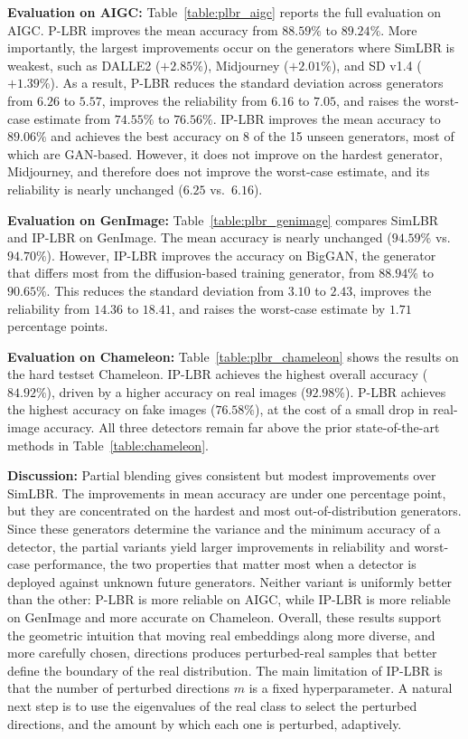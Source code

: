 \noindent\textbf{Evaluation on AIGC:} Table~\ref{table:plbr_aigc} reports the full evaluation on AIGC. P-LBR improves the mean accuracy from $88.59\%$ to $89.24\%$. More importantly, the largest improvements occur on the generators where SimLBR is weakest, such as DALLE2 ($+2.85\%$), Midjourney ($+2.01\%$), and SD v1.4 ($+1.39\%$). As a result, P-LBR reduces the standard deviation across generators from $6.26$ to $5.57$, improves the reliability from $6.16$ to $7.05$, and raises the worst-case estimate from $74.55\%$ to $76.56\%$. IP-LBR improves the mean accuracy to $89.06\%$ and achieves the best accuracy on 8 of the 15 unseen generators, most of which are GAN-based. However, it does not improve on the hardest generator, Midjourney, and therefore does not improve the worst-case estimate, and its reliability is nearly unchanged ($6.25$ vs.\ $6.16$).

\noindent\textbf{Evaluation on GenImage:} Table~\ref{table:plbr_genimage} compares SimLBR and IP-LBR on GenImage. The mean accuracy is nearly unchanged ($94.59\%$ vs.\ $94.70\%$). However, IP-LBR improves the accuracy on BigGAN, the generator that differs most from the diffusion-based training generator, from $88.94\%$ to $90.65\%$. This reduces the standard deviation from $3.10$ to $2.43$, improves the reliability from $14.36$ to $18.41$, and raises the worst-case estimate by $1.71$ percentage points.

\noindent\textbf{Evaluation on Chameleon:} Table~\ref{table:plbr_chameleon} shows the results on the hard testset Chameleon. IP-LBR achieves the highest overall accuracy ($84.92\%$), driven by a higher accuracy on real images ($92.98\%$). P-LBR achieves the highest accuracy on fake images ($76.58\%$), at the cost of a small drop in real-image accuracy. All three detectors remain far above the prior state-of-the-art methods in Table~\ref{table:chameleon}.

\noindent\textbf{Discussion:} Partial blending gives consistent but modest improvements over SimLBR. The improvements in mean accuracy are under one percentage point, but they are concentrated on the hardest and most out-of-distribution generators. Since these generators determine the variance and the minimum accuracy of a detector, the partial variants yield larger improvements in reliability and worst-case performance, the two properties that matter most when a detector is deployed against unknown future generators. Neither variant is uniformly better than the other: P-LBR is more reliable on AIGC, while IP-LBR is more reliable on GenImage and more accurate on Chameleon. Overall, these results support the geometric intuition that moving real embeddings along more diverse, and more carefully chosen, directions produces perturbed-real samples that better define the boundary of the real distribution. The main limitation of IP-LBR is that the number of perturbed directions $m$ is a fixed hyperparameter. A natural next step is to use the eigenvalues of the real class to select the perturbed directions, and the amount by which each one is perturbed, adaptively.


